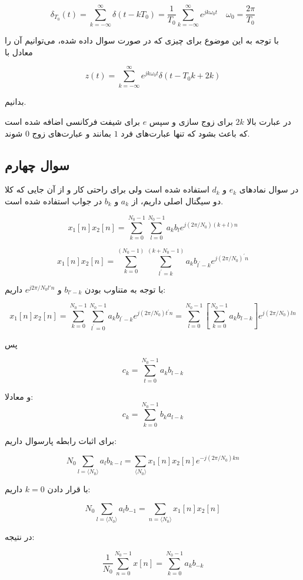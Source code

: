 \documentclass[12pt]{article}
\begin{document}
$$
\delta_{T_{0}}(t)=\sum_{k=-\infty}^{\infty} \delta\left(t-k T_{0}\right)=\frac{1}{T_{0}} \sum_{k=-\infty}^{\infty} e^{j k \omega_{0} t} \quad \omega_{0}=\frac{2 \pi}{T_{0}}
$$


با توجه به این موضوع برای چیزی که در صورت سوال داده شده، می‌توانیم آن را معادل با 

$$
z(t)=\sum_{k=-\infty}^{\infty} e^{j k \omega_{0} t} \delta(t-T_0 k+2 k)
$$

بدانیم.

در عبارت بالا $2k$ برای زوج سازی و سپس $e$ برای شیفت فرکانسی اضافه شده است که باعث بشود که تنها عبارت‌های فرد $1$ بمانند و عبارت‌های زوج $0$ شوند.



\newpage

\subsection{سوال چهارم}

در سوال نمادهای $e_k$ و $d_k$ استفاده شده است ولی برای راحتی کار و از آن جایی که کلا دو سیگنال اصلی داریم، از $a_k$ و $b_k$ در جواب استفاده شده است.

$$
x_1[n] x_2[n]=\sum_{k=0}^{N_0-1} \sum_{l=0}^{N_0-1} a_{k} b_{l} e^{j(2 \pi / N_0)(k+l) n}
$$

$$
x_1[n] x_2[n]=\sum_{k=0}^{(N_0-1)} \sum_{l^{\prime}=k}^{(k+N_0-1)} a_{k} b_{l^{\prime}-k} e^{j(2 \pi / N_0)^{\prime} n}
$$

با توجه به متناوب بودن
$b_{l' -k}$
و
$e^{j 2\pi /N_0 l' n}$
داریم:

$$
x_1[n] x_2[n]=\sum_{k=0}^{N_0-1} \sum_{l^{\prime}=0}^{N_0-1} a_{k} b_{l^{\prime}-k} e^{j(2 \pi / N_0) t^{\prime} n}=\sum_{l=0}^{N_0-1}\left[\sum_{k=0}^{N_0-1} a_{k} b_{l-k}\right] e^{j(2 \pi / N_0) l n}
$$

پس

$$
c_{k}=\sum_{t=0}^{N_0-1} a_{k} b_{l-k}
$$

و معادلا:
$$
c_{k}=\sum_{k=0}^{N_0-1} b_{k} a_{l-k}
$$

برای اثبات رابطه پارسوال داریم:


$$
N_0 \sum_{l=\langle N_0\rangle} a_{l} b_{k-l}=\sum_{\langle N_0\rangle} x_1[n] x_2[n] e^{-j(2 \pi / N_0) k n}
$$

با قرار دادن $k=0$ داریم:

$$
N_0 \sum_{l=\langle N_0\rangle} a_{l} b_{-1}=\sum_{n= \langle N_0\rangle} x_1[n] x_2[n]
$$

در نتیجه:

$$
\frac{1}{N_{0}} \sum_{n=0}^{N_{0}-1} x[n]=\sum_{k=0}^{N_{0}-1} a_{k} b_{-k}
$$
\end{document}
